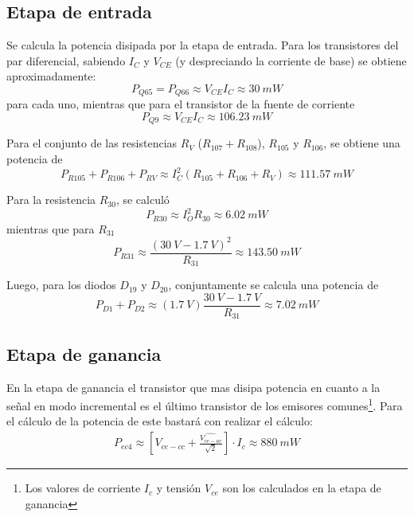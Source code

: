 %
%
%


\subsection{Etapa de entrada}
Se calcula la potencia disipada por la etapa de entrada. Para los transistores del par diferencial, sabiendo $I_C$ y $V_{CE}$ (y despreciando la corriente de base) se obtiene aproximadamente: 
\begin{equation} 
	P_{Q65} = P_{Q66} \approx V_{CE} I_C \approx 30 \ mW
\end{equation}
para cada uno, mientras que para el transistor de la fuente de corriente
\begin{equation} 
	P_{Q9} \approx V_{CE} I_C \approx 106.23 \ mW
\end{equation}

Para el conjunto de las resistencias $R_V$ ($R_{107} + R_108$), $R_{105}$ y $R_{106}$, se obtiene una potencia de
\begin{equation} 
	P_{R105} + P_{R106} + P_{RV} \approx  I_C^2 \left(R_{105} + R_{106} + R_V \right) \approx 111.57 \ mW
\end{equation}

Para la resistencia $R_{30}$, se calculó 
\begin{equation} 
	P_{R30} \approx  I_O^2 R_{30} \approx 6.02 \ mW
\end{equation}
mientras que para $R_{31}$
\begin{equation} 
	P_{R31} \approx  \frac{\left( 30 \ V - 1.7 \ V \right)^2}{R_{31}} \approx 143.50 \ mW
\end{equation}

Luego, para los diodos $D_{19}$ y $D_{20}$, conjuntamente se calcula una potencia de
\begin{equation} 
	P_{D1} + P_{D2} \approx  \left( 1.7 \ V \right) \frac{30 \ V - 1.7 \ V}{R_{31}} \approx 7.02 \ mW
\end{equation}

\subsection{Etapa de ganancia}
En la etapa de ganancia el transistor que mas disipa potencia en cuanto a la señal en modo incremental es el último transistor de los emisores comunes\footnote{Los valores de corriente $I_c$ y tensión $V_{ce}$ son los calculados en la etapa de ganancia}. Para el cálculo de la potencia de este bastará con realizar el cálculo:
\begin{align}
P_{ec4}\approx\left[V_{ce-cc} + \frac{\hat{V_{ce-ac}}}{\sqrt{2}}\right]\cdot I_c\approx 880 \ mW
\end{align}

